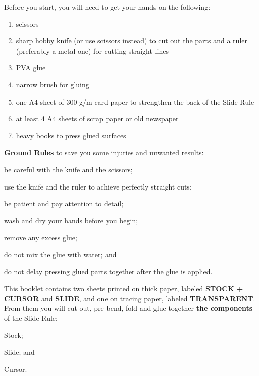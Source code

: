   \begin{multicols*}{3}
  \normalsize{Before you start, you will need to get your hands on the following:
    \begin{enumerate}
      \setlength{\parskip}{0pt}
      \setlength{\parsep}{0pt}
      \item scissors
      \item sharp hobby knife (or use scissors instead) to cut out the parts and a ruler (preferably a metal one) for cutting straight lines
      \item PVA glue
      \item narrow brush for gluing
      \item one A4 sheet of 300 g/m card paper to strengthen the back of the Slide Rule
      \item at least 4 A4 sheets of scrap paper or old newspaper
      \item heavy books to press glued surfaces
    \end{enumerate}

  \textbf{Ground Rules} to save you some injuries and unwanted results:
    \begin{inparaenum}
      \item be careful with the knife and the scissors;
      \item use the knife and the ruler to achieve perfectly straight cuts;
      \item be patient and pay attention to detail;
      \item wash and dry your hands before you begin;
      \item remove any excess glue;
      \item do not mix the glue with water; and
      \item do not delay pressing glued parts together after the glue is applied.
    \end{inparaenum}

  This booklet contains two sheets printed on thick paper, labeled \textbf{STOCK + CURSOR} and \textbf{SLIDE}, and one on tracing paper, labeled \textbf{TRANSPARENT}. From them you will cut out, pre-bend, fold and glue together \textbf{the components} of the Slide Rule:
    \begin{inparaenum}
      \item Stock;
      \item Slide; and
      \item Cursor.
    \end{inparaenum}

}
\end{multicols*}
